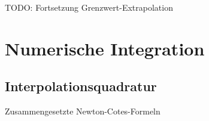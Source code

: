 TODO: Fortsetzung Grenzwert-Extrapolation

\section{Numerische Integration}

\subsection{Interpolationsquadratur}

Zusammengesetzte Newton-Cotes-Formeln
